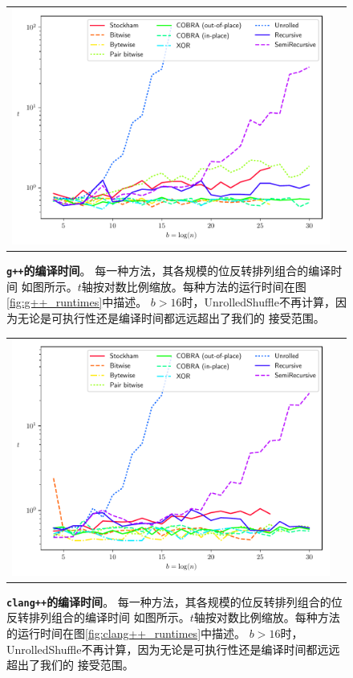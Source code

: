 \documentclass[10pt]{article}
\begin{document}
\begin{CJK*}{UTF8}{gbsn}
\begin{figure}[ht!]
\centering
\begin{tabular}{cc}
  \includegraphics[width=4.5in]{results/g++_compile_times.pdf}
\end{tabular}
\caption{{\bf {\tt g++}的编译时间}。 每一种方法，其各规模的位反转排列组合的编译时间
   如图所示。$t$轴按对数比例缩放。每种方法的运行时间在图\ref{fig:g++_runtimes}中描述。
   $b>16$时，UnrolledShuffle不再计算，因为无论是可执行性还是编译时间都远远超出了我们的
   接受范围。
  \label{fig:g++_compile_times} 
}
\end{figure}


\begin{figure}[ht!]
\centering
\begin{tabular}{cc}
  \includegraphics[width=4.5in]{results/clang++_compile_times.pdf}
\end{tabular}
\caption{{\bf {\tt clang++}的编译时间}。           每一种方法，其各规模的位反转排列组合的位反转排列组合的编译时间
   如图所示。$t$轴按对数比例缩放。每种方法的运行时间在图\ref{fig:clang++_runtimes}中描述。
   $b>16$时，UnrolledShuffle不再计算，因为无论是可执行性还是编译时间都远远超出了我们的
   接受范围。
  \label{fig:clang++_compile_times} 
}
\end{figure}


\end{CJK*}
\end{document}

